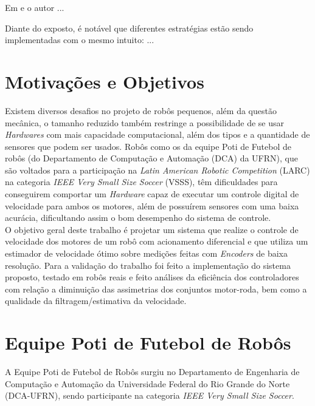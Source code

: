 Em \cite{Y_HORI_01} e \cite{Y_HORI_02} o autor ...


Diante do exposto, é notável que diferentes estratégias estão sendo implementadas com o mesmo intuito: ...

\section{Motivações e Objetivos}
Existem diversos desafios no projeto de robôs pequenos, além da questão mecânica, o tamanho reduzido também restringe a possibilidade de se usar \emph{Hardwares} com mais capacidade computacional, além dos tipos e a quantidade de sensores que podem ser usados. Robôs como os da equipe Poti de Futebol de robôs (do Departamento de Computação e Automação (DCA) da UFRN), que são voltados para a participação na \emph{Latin American Robotic Competition} (LARC) na categoria \emph{IEEE Very Small Size Soccer} (VSSS), têm dificuldades para conseguirem comportar um \emph{Hardware} capaz de executar um controle digital de velocidade para ambos os motores, além de possuírem sensores com uma baixa acurácia, dificultando assim o bom desempenho do sistema de controle.\\

O objetivo geral deste trabalho é projetar um sistema que realize o controle de velocidade dos motores de um robô com acionamento diferencial e que utiliza um estimador de velocidade ótimo sobre medições feitas com \emph{Encoders} de baixa resolução. Para a validação do trabalho foi feito a implementação do sistema proposto, testado em robôs reais e feito análises da eficiência dos controladores com relação a diminuição das assimetrias dos conjuntos motor-roda, bem como a qualidade da filtragem/estimativa da velocidade. %

\section{Equipe Poti de Futebol de Robôs}
\label{sec:Equipe_Poti}

A Equipe Poti de Futebol de Robôs surgiu no Departamento de Engenharia de Computação e Automação da Universidade Federal do Rio Grande do Norte (DCA-UFRN), sendo participante na categoria \emph{IEEE Very Small Size Soccer}.\\

